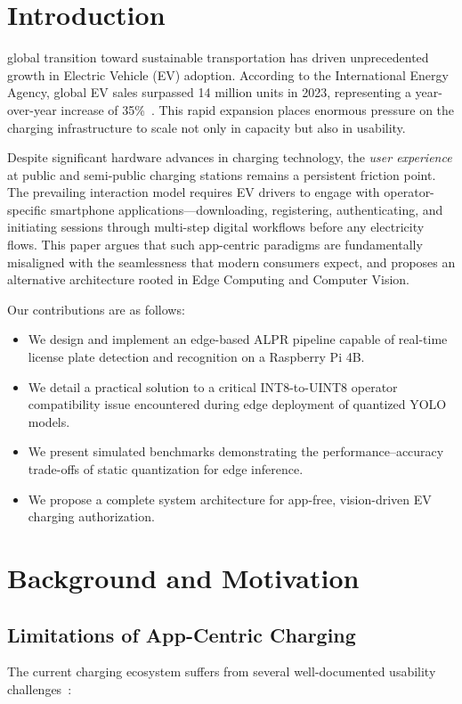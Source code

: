 \documentclass[conference]{IEEEtran}
\begin{document}
\section{Introduction}
 global transition toward sustainable transportation has driven unprecedented growth in Electric Vehicle (EV) adoption. According to the International Energy Agency, global EV sales surpassed 14 million units in 2023, representing a year-over-year increase of 35\%~\cite{b1}. This rapid expansion places enormous pressure on the charging infrastructure to scale not only in capacity but also in usability.

Despite significant hardware advances in charging technology, the \textit{user experience} at public and semi-public charging stations remains a persistent friction point. The prevailing interaction model requires EV drivers to engage with operator-specific smartphone applications---downloading, registering, authenticating, and initiating sessions through multi-step digital workflows before any electricity flows. This paper argues that such app-centric paradigms are fundamentally misaligned with the seamlessness that modern consumers expect, and proposes an alternative architecture rooted in Edge Computing and Computer Vision.

Our contributions are as follows:
\begin{itemize}
\item We design and implement an edge-based ALPR pipeline capable of real-time license plate detection and recognition on a Raspberry Pi 4B.
\item We detail a practical solution to a critical INT8-to-UINT8 operator compatibility issue encountered during edge deployment of quantized YOLO models.
\item We present simulated benchmarks demonstrating the performance--accuracy trade-offs of static quantization for edge inference.
\item We propose a complete system architecture for app-free, vision-driven EV charging authorization.
\end{itemize}

\section{Background and Motivation}

\subsection{Limitations of App-Centric Charging}
The current charging ecosystem suffers from several well-documented usability challenges~\cite{b2}:
\end{document}
